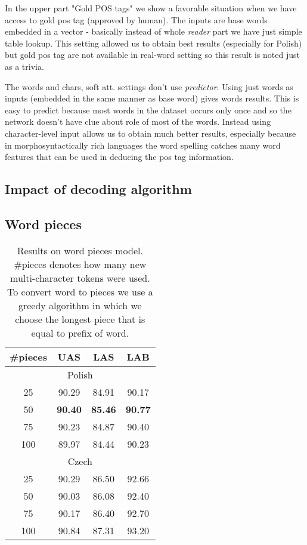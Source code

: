 In the upper part "Gold POS tags" we show a favorable situation when we have access
to gold pos tag (approved by human). The inputs are base words embedded in a vector - 
basically instead of whole \emph{reader} part we have just simple table lookup.
This setting allowed us to obtain best results (especially for Polish) but
gold pos tag are not available in real-word setting so this result is noted just
as a trivia.

The words and chars, soft att. settings don't use \emph{predictor}. Using just words
as inputs (embedded in the same manner as base word) gives words results. This is
easy to predict because most words in the dataset occurs only once and so the
network doesn't have clue about role of most of the words.
Instead using character-level input allows us to obtain much better results, especially
because in morphosyntactically rich languages the word spelling catches many
word features that can be used in deducing the pos tag information.



\subsection{Impact of decoding algorithm}


\subsection{Word pieces}
\begin{table}[!htbp]
    \centering
    \begin{tabular}{c c c c}
        \#pieces & UAS & LAS & LAB \\ \hline
        \multicolumn{4}{c}{Polish}\\
        25 & 90.29 &  84.91 &  90.17 \\
        50 & \textbf{90.40} &  \textbf{85.46} &  \textbf{90.77} \\
        75 &  90.23 & 84.87 &  90.40 \\
        100 & 89.97 & 84.44 & 90.23 \\\hline
        \multicolumn{4}{c}{Czech}\\
        25 & 90.29 & 86.50 & 92.66\\
        50 & 90.03 & 86.08 & 92.40\\
        75 & 90.17 & 86.40 & 92.70\\
        100 &90.84 & 87.31 & 93.20
    \end{tabular}
    \caption{Results on word pieces model. \#pieces denotes how many new
    multi-character tokens were used. To convert word to pieces we
    use a greedy algorithm in which we choose the longest piece that is equal
    to prefix of word.}
    \label{tab:word_pieces}
\end{table}


